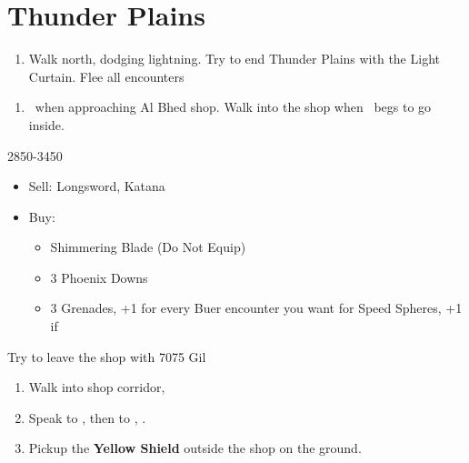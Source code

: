 \chapter{Thunder Plains}

\begin{enumerate}
	\item Walk north, dodging lightning. Try to end Thunder Plains with the Light Curtain. Flee all encounters
\end{enumerate}
\begin{enumerate}[resume]
	\item \sd\ when approaching Al Bhed shop. Walk into the shop when \rikku\ begs to go inside.
\end{enumerate}
\begin{shop}{2850-3450}
	\begin{itemize}
		\item Sell: Longsword, Katana
		\item Buy:
		      \begin{itemize}
			      \item Shimmering Blade (Do Not Equip)
			      \item 3 Phoenix Downs
			      \item 3 Grenades, +1 for every Buer encounter you want for Speed Spheres, +1 if \blitzloss
		      \end{itemize}
	\end{itemize}
	Try to leave the shop with 7075 Gil
\end{shop}
\begin{enumerate}[resume]
	\item Walk into shop corridor, \cs[2:00]
	\item Speak to \auron, then to \rikku, \sd.
	\item Pickup the \textbf{Yellow Shield} outside the shop on the ground.
\end{enumerate}

